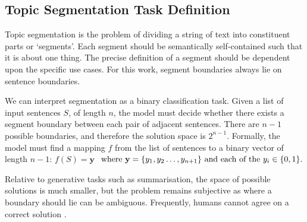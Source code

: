 
\subsection{Topic Segmentation Task Definition}
Topic segmentation is the problem of dividing a string of text into constituent parts or ‘segments’. Each segment should be semantically self-contained such that it is about one thing. The precise definition of a segment should be dependent upon the specific use cases. For this work, segment boundaries always lie on sentence boundaries.

We can interpret segmentation as a binary classification task.  Given a list of input sentences $S$, of length $n$, the model must decide whether there exists a segment boundary between each pair of adjacent sentences. There are $n-1$ possible boundaries, and therefore the solution space is $2^{n-1}$.  Formally, the model must find a mapping $f$ from the list of sentences to a binary vector of length $n-1$:
\(
     f(S) = \textbf{y} 
\)
\( \textnormal{ where } \textbf{y}=\{y_1,y_2\ldots,y_{n+1}\} \textnormal{ and each of the } y_i\in\{0,1\}.
\)

Relative to generative tasks such as summarisation, the space of possible solutions is much smaller, but the problem remains subjective as where a boundary should lie can be ambiguous. Frequently, humans cannot agree on a correct solution \cite{TextTiling}.



 
